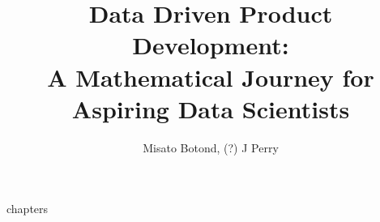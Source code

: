 \documentclass[openany]{book}
\begin{document}
\title{Data Driven Product Development: \\ \large A Mathematical Journey for Aspiring Data Scientists}
\author{Misato Botond, (?) J Perry}
\date{}
\maketitle

\tableofcontents

{{chapters}}

\printindex
\end{document}
